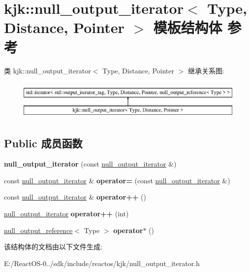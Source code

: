 \hypertarget{structkjk_1_1null__output__iterator}{}\section{kjk\+:\+:null\+\_\+output\+\_\+iterator$<$ Type, Distance, Pointer $>$ 模板结构体 参考}
\label{structkjk_1_1null__output__iterator}
类 kjk\+:\+:null\+\_\+output\+\_\+iterator$<$ Type, Distance, Pointer $>$ 继承关系图\+:\begin{figure}[H]
\begin{center}
\leavevmode
\includegraphics[height=1.992882cm]{structkjk_1_1null__output__iterator}
\end{center}
\end{figure}
\subsection*{Public 成员函数}
\begin{DoxyCompactItemize}
\item 
\mbox{\label{structkjk_1_1null__output__iterator_af0935ea89b31b1aed3703dadc21acc96}} 
{\bfseries null\+\_\+output\+\_\+iterator} (const \hyperlink{structkjk_1_1null__output__iterator}{null\+\_\+output\+\_\+iterator} \&)
\item 
\mbox{\label{structkjk_1_1null__output__iterator_ac6967bc003f8a3caa1f5fae49a1746ce}} 
const \hyperlink{structkjk_1_1null__output__iterator}{null\+\_\+output\+\_\+iterator} \& {\bfseries operator=} (const \hyperlink{structkjk_1_1null__output__iterator}{null\+\_\+output\+\_\+iterator} \&)
\item 
\mbox{\label{structkjk_1_1null__output__iterator_a10757ac9ca3b3de1e5e6c917e46d67a2}} 
const \hyperlink{structkjk_1_1null__output__iterator}{null\+\_\+output\+\_\+iterator} \& {\bfseries operator++} ()
\item 
\mbox{\label{structkjk_1_1null__output__iterator_a88db4ca17aff8502d1cfaa3e6c411e7b}} 
\hyperlink{structkjk_1_1null__output__iterator}{null\+\_\+output\+\_\+iterator} {\bfseries operator++} (int)
\item 
\mbox{\label{structkjk_1_1null__output__iterator_a79da64c0a98bdff416f37ff1baf1a01f}} 
\hyperlink{structkjk_1_1null__output__reference}{null\+\_\+output\+\_\+reference}$<$ Type $>$ {\bfseries operator$\ast$} ()
\end{DoxyCompactItemize}


该结构体的文档由以下文件生成\+:\begin{DoxyCompactItemize}
\item 
E\+:/\+React\+O\+S-\/0../sdk/include/reactos/kjk/null\+\_\+output\+\_\+iterator.\+h\end{DoxyCompactItemize}
